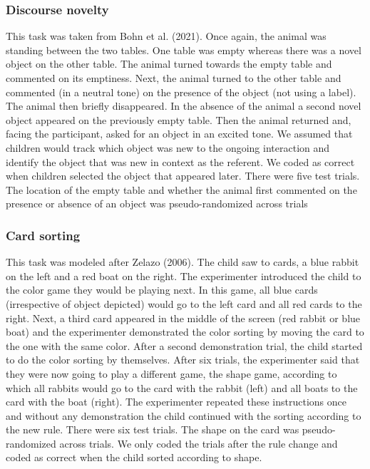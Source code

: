 \documentclass[
  english,
  man,floatsintext]{apa6}
\begin{document}
\hypertarget{discourse-novelty}{%
\subsubsection{Discourse novelty}\label{discourse-novelty}}

This task was taken from Bohn et al. (2021). Once again, the animal was standing between the two tables. One table was empty whereas there was a novel object on the other table. The animal turned towards the empty table and commented on its emptiness. Next, the animal turned to the other table and commented (in a neutral tone) on the presence of the object (not using a label). The animal then briefly disappeared. In the absence of the animal a second novel object appeared on the previously empty table. Then the animal returned and, facing the participant, asked for an object in an excited tone. We assumed that children would track which object was new to the ongoing interaction and identify the object that was new in context as the referent. We coded as correct when children selected the object that appeared later. There were five test trials. The location of the empty table and whether the animal first commented on the presence or absence of an object was pseudo-randomized across trials

\hypertarget{card-sorting}{%
\subsubsection{Card sorting}\label{card-sorting}}

This task was modeled after Zelazo (2006). The child saw to cards, a blue rabbit on the left and a red boat on the right. The experimenter introduced the child to the color game they would be playing next. In this game, all blue cards (irrespective of object depicted) would go to the left card and all red cards to the right. Next, a third card appeared in the middle of the screen (red rabbit or blue boat) and the experimenter demonstrated the color sorting by moving the card to the one with the same color. After a second demonstration trial, the child started to do the color sorting by themselves. After six trials, the experimenter said that they were now going to play a different game, the shape game, according to which all rabbits would go to the card with the rabbit (left) and all boats to the card with the boat (right). The experimenter repeated these instructions once and without any demonstration the child continued with the sorting according to the new rule. There were six test trials. The shape on the card was pseudo-randomized across trials. We only coded the trials after the rule change and coded as correct when the child sorted according to shape.
\end{document}
